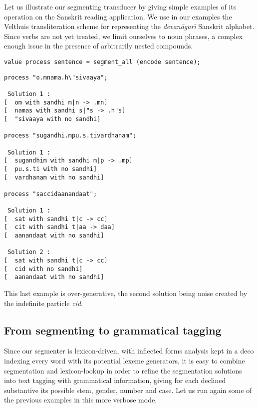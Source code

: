 Let us illustrate our segmenting transducer by giving simple examples of its 
operation on the Sanskrit reading application. We use in our examples
the Velthuis transliteration scheme for representing the
{\sl devan\=agar{\=\i}} Sanskrit alphabet. Since verbs are not yet treated,
we limit ourselves to noun phrases, a complex enough issue in the presence
of arbitrarily nested compounds.

\begin{verbatim}
value process sentence = segment_all (encode sentence);
\end{verbatim}

\begin{verbatim}
process "o.mnama.h\"sivaaya"; 

 Solution 1 :
[  om with sandhi m|n -> .mn]
[  namas with sandhi s|"s -> .h"s]
[  "sivaaya with no sandhi]  

process "sugandhi.mpu.s.tivardhanam";

 Solution 1 :
[  sugandhim with sandhi m|p -> .mp]
[  pu.s.ti with no sandhi]
[  vardhanam with no sandhi]  

process "saccidaanandaat";

 Solution 1 :
[  sat with sandhi t|c -> cc]
[  cit with sandhi t|aa -> daa]
[  aanandaat with no sandhi]

 Solution 2 :
[  sat with sandhi t|c -> cc]
[  cid with no sandhi]
[  aanandaat with no sandhi]   
\end{verbatim}

This last example is over-generative, the second solution being noise
created by the indefinite particle {\sl cid}. 

\subsection{From segmenting to grammatical tagging}

Since our segmenter is lexicon-driven, with inflected forms analysis
kept in a deco indexing every word with its potential lexeme generators,
it is easy to combine segmentation and lexicon-lookup in order to refine
the segmentation solutions into text tagging with grammatical information,
giving for each declined substantive its possible stem, gender, number and 
case. 
Let us run again some of the previous examples in this more verbose mode. 

